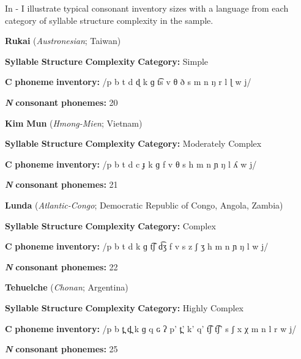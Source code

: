  In - I illustrate typical consonant inventory sizes with a language from each category of syllable structure complexity in the sample.

\ea\label{ex:(4.22)}
  \textbf{Rukai} (\textit{Austronesian}; Taiwan)

\textbf{Syllable} \textbf{Structure} \textbf{Complexity} \textbf{Category:} Simple

\textbf{C} \textbf{phoneme} \textbf{inventory:} /p b t d ɖ k ɡ t͡s v θ ð s m n ŋ r l ɭ w j/

\textbf{\textit{N}} \textbf{consonant} \textbf{phonemes:} 20

\z

\ea\label{ex:(4.23)}
  \textbf{Kim} \textbf{Mun} (\textit{Hmong-Mien}; Vietnam)

\textbf{Syllable} \textbf{Structure} \textbf{Complexity} \textbf{Category:} Moderately Complex

\textbf{C} \textbf{phoneme} \textbf{inventory:} /p b t d c ɟ k ɡ f v θ s h m n ɲ ŋ l ʎ w j/

\textbf{\textit{N}} \textbf{consonant} \textbf{phonemes:} 21
\z

\ea\label{ex:(4.24)}
  \textbf{Lunda} (\textit{Atlantic-Congo}; Democratic Republic of Congo, Angola, Zambia)

\textbf{Syllable} \textbf{Structure} \textbf{Complexity} \textbf{Category:} Complex

\textbf{C} \textbf{phoneme} \textbf{inventory:} /p b t d k ɡ t͡ʃ d͡ʒ f v s z ʃ ʒ h m n ɲ ŋ l w j/

\textbf{\textit{N}} \textbf{consonant} \textbf{phonemes:} 22
\z

\ea\label{ex:(4.25)}
  \textbf{Tehuelche} (\textit{Chonan}; Argentina)

\textbf{Syllable} \textbf{Structure} \textbf{Complexity} \textbf{Category:} Highly Complex

\textbf{C} \textbf{phoneme} \textbf{inventory:} /p b t̪ d̪ k ɡ q ɢ ʔ p’ t̪’ k’ q’ t͡ʃ t͡ʃ’ s ʃ x χ m n l r w j/

\textbf{\textit{N}} \textbf{consonant} \textbf{phonemes:} 25

\z

